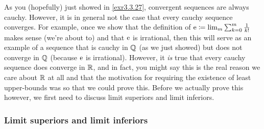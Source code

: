 As you (hopefully) just showed in \cref{exr3.3.27}, convergent sequences are always cauchy.  However, it is in general not the case that every cauchy sequence converges.  For example, once we show that the definition of $\mathrm{e} \coloneqq \lim _m\sum _{k=0}^m\frac{1}{k!}$ makes sense (we're about to) and that $\mathrm{e}$ is irrational, then this will serve as an example of a sequence that is cauchy in $\mathbb{Q}$ (as we just showed) but does not converge in $\mathbb{Q}$ (because $\mathrm{e}$ is irrational).  However, it \emph{is} true that every cauchy sequence does converge in $\mathbb{R}$, and in fact, you might say this is the real reason we care about $\mathbb{R}$ at all and that the motivation for requiring the existence of least upper-bounds was so that we could prove this.  Before we actually prove this however, we first need to discuss limit superiors and limit inferiors.

\subsubsection{Limit superiors and limit inferiors}


